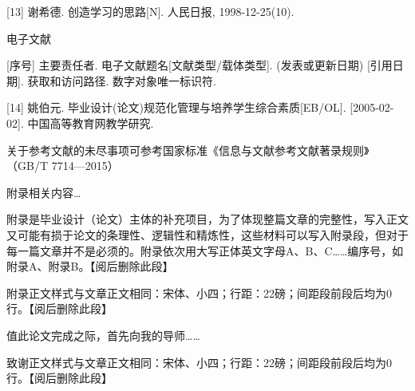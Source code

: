 \documentclass[UTF8,12pt,a4paper,fontset=fandol]{ctexbook}
\begin{document}
[13] 谢希德. 创造学习的思路[N]. 人民日报, 1998-12-25(10).

电子文献

[序号] 主要责任者. 电子文献题名[文献类型/载体类型]. (发表或更新日期) [引用日期]. 获取和访问路径. 数字对象唯一标识符.

[14] 姚伯元. 毕业设计(论文)规范化管理与培养学生综合素质[EB/OL]. [2005-02-02]. 中国高等教育网教学研究.

关于参考文献的未尽事项可参考国家标准《信息与文献参考文献著录规则》（GB/T 7714—2015）

附录相关内容…

附录是毕业设计（论文）主体的补充项目，为了体现整篇文章的完整性，写入正文又可能有损于论文的条理性、逻辑性和精炼性，这些材料可以写入附录段，但对于每一篇文章并不是必须的。附录依次用大写正体英文字母A、B、C……编序号，如附录A、附录B。【阅后删除此段】

附录正文样式与文章正文相同：宋体、小四；行距：22磅；间距段前段后均为0行。【阅后删除此段】

值此论文完成之际，首先向我的导师……

致谢正文样式与文章正文相同：宋体、小四；行距：22磅；间距段前段后均为0行。【阅后删除此段】
\end{document}
